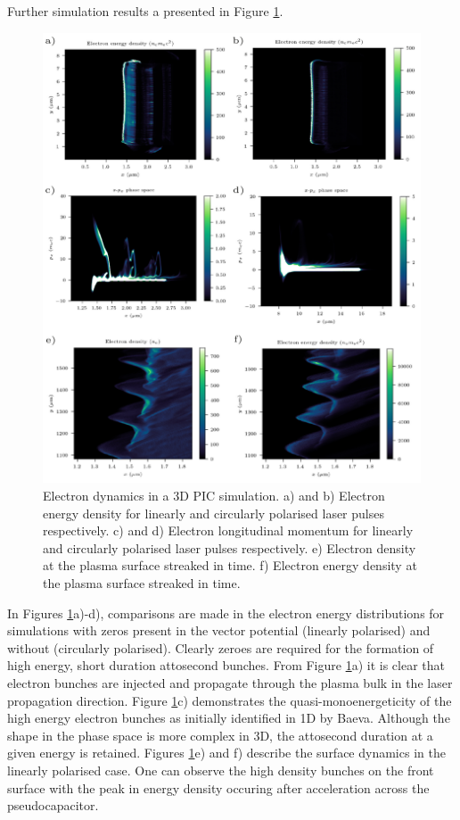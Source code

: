Further simulation results a presented in Figure \ref{fig:zvp3ddynamics}.
\begin{figure}
	\centering
	\includegraphics[width=1\linewidth]{figures/zvp/zvp_3D_dynamics}
	\caption[Electron dynamics in 3D PIC simulation for both linear and cirularly polarised relativistic laser pulses.]{Electron dynamics in a 3D PIC simulation. a) and b) Electron energy density for linearly and circularly polarised laser pulses respectively. c) and d) Electron longitudinal momentum for linearly and circularly polarised laser pulses respectively.  e) Electron density at the plasma surface streaked in time. f) Electron energy density at the plasma surface streaked in time.}
	\label{fig:zvp3ddynamics}
\end{figure}
In Figures \ref{fig:zvp3ddynamics}a)-d), comparisons are made in the electron energy distributions for simulations with zeros present in the vector potential (linearly polarised) and without (circularly polarised). Clearly zeroes are required for the formation of high energy, short duration attosecond bunches. From Figure \ref{fig:zvp3ddynamics}a) it is clear that electron bunches are injected and propagate through the plasma bulk in the laser propagation direction. Figure \ref{fig:zvp3ddynamics}c) demonstrates the quasi-monoenergeticity of the high energy electron bunches as initially identified in 1D by Baeva. Although the shape in the phase space is more complex in 3D, the attosecond duration at a given energy is retained. Figures \ref{fig:zvp3ddynamics}e) and f) describe the surface dynamics in the linearly polarised case. One can observe the high density bunches on the front surface with the peak in energy density occuring after acceleration across the pseudocapacitor.

